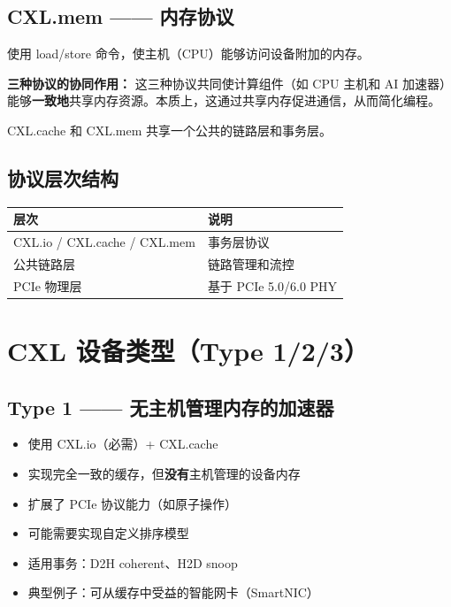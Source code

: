 \documentclass[12pt,a4paper]{article}
\begin{document}
\subsection{CXL.mem —— 内存协议}

\begin{keypoint}
使用 load/store 命令，使主机（CPU）能够访问设备附加的内存。
\end{keypoint}

\begin{analysisbox}
\textbf{三种协议的协同作用：}
这三种协议共同使计算组件（如 CPU 主机和 AI 加速器）能够\textbf{一致地}共享内存资源。本质上，这通过共享内存促进通信，从而简化编程。

CXL.cache 和 CXL.mem 共享一个公共的链路层和事务层。
\end{analysisbox}

\subsection{协议层次结构}

\begin{tcolorbox}[title=CXL 协议栈]
\begin{tabular}{@{}ll@{}}
\toprule
\textbf{层次} & \textbf{说明} \\
\midrule
CXL.io / CXL.cache / CXL.mem & 事务层协议 \\
公共链路层 & 链路管理和流控 \\
PCIe 物理层 & 基于 PCIe 5.0/6.0 PHY \\
\bottomrule
\end{tabular}
\end{tcolorbox}

\section{CXL 设备类型（Type 1/2/3）}

\subsection{Type 1 —— 无主机管理内存的加速器}

\begin{keypoint}[Type 1 设备]
\begin{itemize}
    \item 使用 CXL.io（必需）+ CXL.cache
    \item 实现完全一致的缓存，但\textbf{没有}主机管理的设备内存
    \item 扩展了 PCIe 协议能力（如原子操作）
    \item 可能需要实现自定义排序模型
    \item 适用事务：D2H coherent、H2D snoop
    \item 典型例子：可从缓存中受益的智能网卡（SmartNIC）
\end{itemize}
\end{keypoint}
\end{document}
